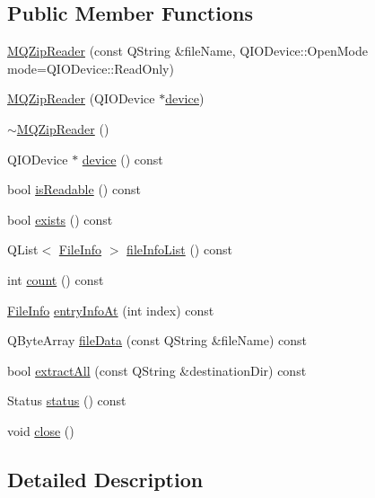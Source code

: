 \subsection*{Public Member Functions}
\begin{DoxyCompactItemize}
\item 
\hyperlink{class_m_q_zip_reader_a3b7f7b85a1674386dc4a7b7240f4e2dc}{M\+Q\+Zip\+Reader} (const Q\+String \&file\+Name, Q\+I\+O\+Device\+::\+Open\+Mode mode=Q\+I\+O\+Device\+::\+Read\+Only)
\item 
\hyperlink{class_m_q_zip_reader_ab8f57ca2da4654b4696b0fa7635d2cff}{M\+Q\+Zip\+Reader} (Q\+I\+O\+Device $\ast$\hyperlink{class_m_q_zip_reader_aff10cccb86592a1d9c228195996fdd11}{device})
\item 
\hyperlink{class_m_q_zip_reader_ac669746daffc30103dab493e990ca141}{$\sim$\+M\+Q\+Zip\+Reader} ()
\item 
Q\+I\+O\+Device $\ast$ \hyperlink{class_m_q_zip_reader_aff10cccb86592a1d9c228195996fdd11}{device} () const
\item 
bool \hyperlink{class_m_q_zip_reader_a54bd229faa64c78ec36475da770831d6}{is\+Readable} () const
\item 
bool \hyperlink{class_m_q_zip_reader_aa5e59037b1d83324f7f5d55d9289079a}{exists} () const
\item 
Q\+List$<$ \hyperlink{struct_m_q_zip_reader_1_1_file_info}{File\+Info} $>$ \hyperlink{class_m_q_zip_reader_a73e39077044aed4642ee02252cc08970}{file\+Info\+List} () const
\item 
int \hyperlink{class_m_q_zip_reader_a31a932689f554f36f097b96387788e94}{count} () const
\item 
\hyperlink{struct_m_q_zip_reader_1_1_file_info}{File\+Info} \hyperlink{class_m_q_zip_reader_a93ce1fd5d0d56e582b882a1335d43449}{entry\+Info\+At} (int index) const
\item 
Q\+Byte\+Array \hyperlink{class_m_q_zip_reader_a6f6a36b121208a4fae0f17c9c4f3fd93}{file\+Data} (const Q\+String \&file\+Name) const
\item 
bool \hyperlink{class_m_q_zip_reader_abe62477c78fb2964a80d502821608962}{extract\+All} (const Q\+String \&destination\+Dir) const
\item 
Status \hyperlink{class_m_q_zip_reader_a0d69600eed44ee33e5b8e8cc90238452}{status} () const
\item 
void \hyperlink{class_m_q_zip_reader_a4f83f0feb67643ef0f119669184a4edd}{close} ()
\end{DoxyCompactItemize}


\subsection{Detailed Description}


